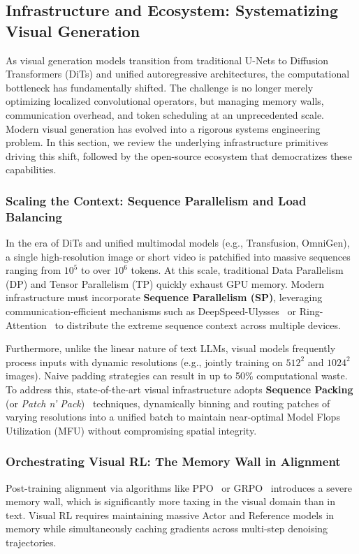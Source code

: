 \documentclass{llmxive}
\begin{document}
\subsection{Infrastructure and Ecosystem: Systematizing Visual Generation}
\label{subsec:infrastructure_systems}

As visual generation models transition from traditional U-Nets to Diffusion Transformers (DiTs) and unified autoregressive architectures, the computational bottleneck has fundamentally shifted. The challenge is no longer merely optimizing localized convolutional operators, but managing memory walls, communication overhead, and token scheduling at an unprecedented scale. Modern visual generation has evolved into a rigorous systems engineering problem. In this section, we review the underlying infrastructure primitives driving this shift, followed by the open-source ecosystem that democratizes these capabilities.

\subsubsection{Scaling the Context: Sequence Parallelism and Load Balancing}
\label{subsubsec:infra_scaling_context}
In the era of DiTs and unified multimodal models (e.g., Transfusion, OmniGen), a single high-resolution image or short video is patchified into massive sequences ranging from $10^5$ to over $10^6$ tokens. At this scale, traditional Data Parallelism (DP) and Tensor Parallelism (TP) quickly exhaust GPU memory. Modern infrastructure must incorporate \textbf{Sequence Parallelism (SP)}, leveraging communication-efficient mechanisms such as DeepSpeed-Ulysses~\citep{jacobs2023deepspeed} or Ring-Attention~\citep{liu2023ring} to distribute the extreme sequence context across multiple devices.

Furthermore, unlike the linear nature of text LLMs, visual models frequently process inputs with dynamic resolutions (e.g., jointly training on $512^2$ and $1024^2$ images). Naive padding strategies can result in up to 50\% computational waste. To address this, state-of-the-art visual infrastructure adopts \textbf{Sequence Packing} (or \emph{Patch n' Pack})~\citep{dehghani2023patch} techniques, dynamically binning and routing patches of varying resolutions into a unified batch to maintain near-optimal Model Flops Utilization (MFU) without compromising spatial integrity.

\subsubsection{Orchestrating Visual RL: The Memory Wall in Alignment}
\label{subsubsec:infra_visual_rl}
Post-training alignment via algorithms like PPO~\citep{schulman2017proximal} or GRPO~\citep{shao2024deepseekmath} introduces a severe memory wall, which is significantly more taxing in the visual domain than in text. Visual RL requires maintaining massive Actor and Reference models in memory while simultaneously caching gradients across multi-step denoising trajectories.
\end{document}
